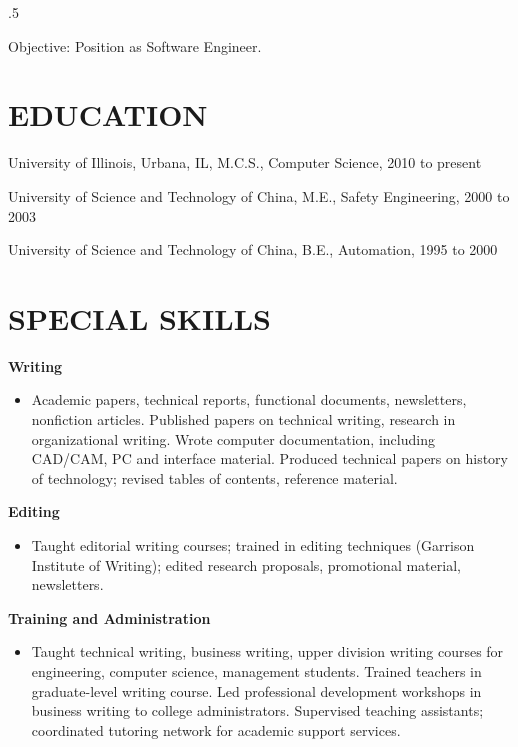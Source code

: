 \documentclass{res}
\begin{document}
 
\thispagestyle{empty} %
\address{111 South Busey Street\\
Urbana, IL 61801\\
(217) 898 - 3636}


\begin{resume}
\vspace{0.1in}
\moveleft.5\sectionwidth\centerline{Objective: Position as Software Engineer.}  

\section{EDUCATION}
\vspace{0.1in} 

    University of Illinois, Urbana, IL, M.C.S., 
    Computer Science, 2010 to present

    University of Science and Technology of China, M.E., Safety Engineering, 
    2000 to 2003

    University of Science and Technology of China, B.E., Automation, 
    1995 to 2000
 
\section{SPECIAL SKILLS} 
\vspace{0.1in}
  {\bf Writing}
    \begin{itemize} %
      \item[] Academic papers, technical reports, functional documents, 
        newsletters, nonfiction articles. Published papers on 
        technical writing, research in organizational writing. 
        Wrote computer documentation, including CAD/CAM, PC and 
        interface material. Produced technical papers on history 
        of technology; revised tables of contents, reference 
        material. 
      \end{itemize}
  {\bf Editing} 
       \begin{itemize}
        \item[] Taught editorial writing courses; trained in editing 
        techniques (Garrison Institute of Writing); edited 
        research proposals, promotional material, newsletters.
    \end{itemize}

  {\bf Training and Administration} 
        \begin{itemize}
        \item[] Taught technical writing, business writing, upper 
        division writing courses for engineering, computer 
        science, management students. Trained teachers in 
        graduate-level writing course. Led professional 
        development workshops in business writing to college 
        administrators. Supervised teaching assistants; 
        coordinated tutoring network for academic support 
        services. 
       \end{itemize}


\end{resume}
\end{document}
